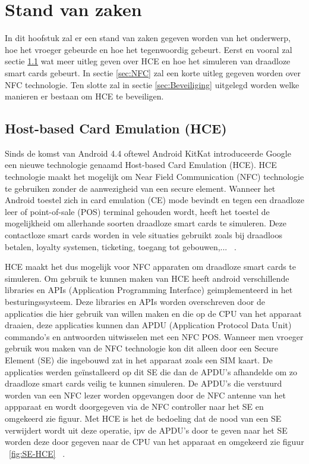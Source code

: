 \chapter{Stand van zaken}
\label{ch:stand-van-zaken}




In dit hoofstuk zal er een stand van zaken gegeven worden van het onderwerp, hoe het vroeger gebeurde en hoe het tegenwoordig gebeurt. Eerst en vooral zal sectie \ref{sec:HCE} wat meer uitleg geven over HCE en hoe het simuleren van draadloze smart cards gebeurt. In sectie \ref{sec:NFC} zal een korte uitleg gegeven worden over NFC technologie. Ten slotte zal in sectie \ref{sec:Beveiliging} uitgelegd worden welke manieren er bestaan om HCE te beveiligen.


\section{Host-based Card Emulation (HCE)}
\label{sec:HCE}
Sinds de komst van Android 4.4 oftewel Android KitKat introduceerde Google een nieuwe technologie genaamd Host-based Card Emulation (HCE). HCE technologie maakt het mogelijk om Near Field Communication (NFC) technologie te gebruiken zonder de aanwezigheid van een secure element. 
Wanneer het Android toestel zich in card emulation (CE) mode bevindt en tegen een draadloze leer of point-of-sale (POS) terminal gehouden wordt, heeft het toestel de mogelijkheid om allerhande soorten draadloze smart cards te simuleren. Deze contactloze smart cards worden in vele situaties gebruikt zoals bij draadloos betalen, loyalty systemen, ticketing, toegang tot gebouwen,... ~\autocite{SCA2014}.

HCE maakt het dus mogelijk voor NFC apparaten om draadloze smart cards te simuleren. Om gebruik te kunnen maken van HCE heeft android verschillende libraries en APIs (Application Programming Interface) geimplementeerd in het besturingssysteem. Deze libraries en APIs worden overschreven door de applicaties die hier gebruik van willen maken en die op de CPU van het apparaat draaien, deze applicaties kunnen dan APDU (Application Protocol Data Unit) commando's en antwoorden uitwisselen met een NFC POS. Wanneer men vroeger gebruik wou maken van de NFC technologie kon dit alleen door een Secure Element (SE) die ingebouwd zat in het apparaat zoals een SIM kaart. De applicaties werden geïnstalleerd op dit SE die dan de APDU's afhandelde om zo draadloze smart cards veilig te kunnen simuleren. De APDU's die verstuurd worden van een NFC lezer worden opgevangen door de NFC antenne van het appparaat en wordt doorgegeven via de NFC controller naar het SE en omgekeerd zie figuur. Met HCE is het de bedoeling dat de nood van een SE verwijdert wordt uit deze operatie, ipv de APDU's door te geven naar het SE worden deze door gegeven naar de CPU van het apparaat en omgekeerd zie figuur ~\ref{fig:SE-HCE} ~\autocite{Alattar2014}. 

